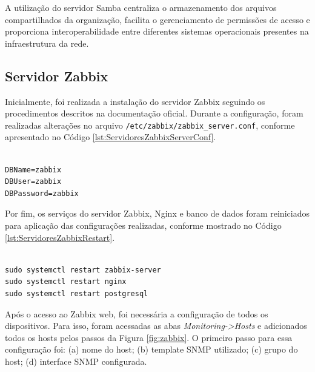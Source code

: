 A utilização do servidor Samba centraliza o armazenamento dos arquivos compartilhados da organização, facilita o gerenciamento de permissões de acesso e proporciona interoperabilidade entre diferentes sistemas operacionais presentes na infraestrutura da rede.

\subsection{Servidor Zabbix}

Inicialmente, foi realizada a instalação do servidor Zabbix seguindo os procedimentos descritos na documentação oficial. Durante a configuração, foram realizadas alterações no arquivo \texttt{/etc/zabbix/zabbix\_server.conf}, conforme apresentado no Código \ref{lst:ServidoresZabbixServerConf}.

\begin{listing}[H]
\centering
\begin{verbatim}

DBName=zabbix
DBUser=zabbix
DBPassword=zabbix

\end{verbatim}
\caption{Configuração do arquivo zabbix\_server.conf}
\label{lst:ServidoresZabbixServerConf}
\end{listing}

Por fim, os serviços do servidor Zabbix, Nginx e banco de dados foram reiniciados para aplicação das configurações realizadas, conforme mostrado no Código \ref{lst:ServidoresZabbixRestart}.

\begin{listing}[H]
\centering
\begin{verbatim}

sudo systemctl restart zabbix-server
sudo systemctl restart nginx
sudo systemctl restart postgresql

\end{verbatim}
\caption{Reinicialização dos serviços do servidor Zabbix}
\label{lst:ServidoresZabbixRestart}
\end{listing}

Após o acesso ao Zabbix web, foi necessária a configuração de todos os dispositivos. Para isso, foram acessadas as abas \textit{Monitoring->Hosts} e adicionados todos os hosts pelos passos da Figura \ref{fig:zabbix}. O primeiro passo para essa configuração foi: (a) nome do host; (b) template SNMP utilizado; (c) grupo do host; (d) interface SNMP configurada.

